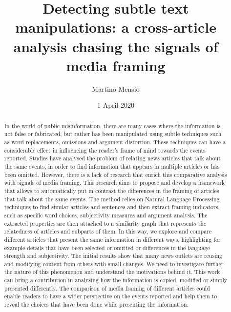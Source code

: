 \documentclass[12pt]{scrartcl}
\title{Detecting subtle text manipulations: a cross-article analysis chasing the signals of media framing}
\author{Martino Mensio}
\date{1 April 2020}
\begin{document}
\maketitle

\begin{abstract}
In the world of public misinformation, there are many cases where the information is not false or fabricated, but rather has been manipulated using subtle techniques such as word replacements, omissions and argument distortion. These techniques can have a considerable effect in influencing the reader’s frame of mind towards the events reported.
Studies have analysed the problem of relating news articles that talk about the same events, in order to find information that appears in multiple articles or has been omitted. However, there is a lack of research that enrich this comparative analysis with signals of media framing.
This research aims to propose and develop a framework that allows to automatically put in contrast the differences in the framing of articles that talk about the same events.
The method relies on Natural Language Processing techniques to find similar articles and sentences and then extract framing indicators, such as specific word choices, subjectivity measures and argument analysis. The extracted properties are then attached to a similarity graph that represents the relatedness of articles and subparts of them. In this way, we explore and compare different articles that present the same information in different ways, highlighting for example details that have been selected or omitted or differences in the language strength and subjectivity.
The initial results show that many news outlets are reusing and modifying content from others with small changes. We need to investigate further the nature of this phenomenon and understand the motivations behind it.
This work can bring a contribution in analysing how the information is copied, modified or simply presented differently. The comparison of media framing of different articles could enable readers to have a wider perspective on the events reported and help them to reveal the choices that have been done while presenting the information.
\end{abstract}
\end{document}
